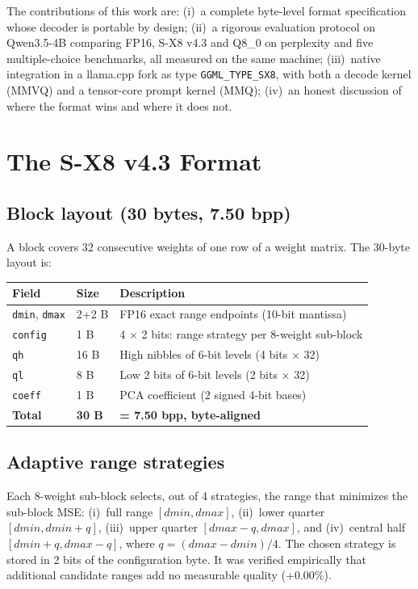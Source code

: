 \documentclass[11pt]{article}
\begin{document}
The contributions of this work are: (i)~a complete byte-level format specification whose decoder is portable by design;
(ii)~a rigorous evaluation protocol on Qwen3.5-4B comparing FP16, S-X8 v4.3 and Q8\_0 on perplexity and
five multiple-choice benchmarks, all measured on the same machine; (iii)~native integration in a llama.cpp
fork as type \texttt{GGML\_TYPE\_SX8}, with both a decode kernel (MMVQ) and a tensor-core prompt kernel
(MMQ); (iv)~an honest discussion of where the format wins and where it does not.

\section{The S-X8 v4.3 Format}
\subsection{Block layout (30 bytes, 7.50 bpp)}
A block covers 32 consecutive weights of one row of a weight matrix. The 30-byte layout is:
\begin{center}
\begin{tabular}{lll}
\toprule
Field & Size & Description \\
\midrule
\texttt{dmin}, \texttt{dmax} & 2+2 B & FP16 exact range endpoints (10-bit mantissa) \\
\texttt{config} & 1 B & 4 $\times$ 2 bits: range strategy per 8-weight sub-block \\
\texttt{qh} & 16 B & High nibbles of 6-bit levels (4 bits $\times$ 32) \\
\texttt{ql} & 8 B & Low 2 bits of 6-bit levels (2 bits $\times$ 32) \\
\texttt{coeff} & 1 B & PCA coefficient (2 signed 4-bit bases) \\
\textbf{Total} & \textbf{30 B} & \textbf{= 7.50 bpp, byte-aligned} \\
\bottomrule
\end{tabular}
\end{center}

\subsection{Adaptive range strategies}
Each 8-weight sub-block selects, out of 4 strategies, the range that minimizes the sub-block MSE:
(i)~full range $[\mathit{dmin}, \mathit{dmax}]$, (ii)~lower quarter $[\mathit{dmin}, \mathit{dmin}+q]$,
(iii)~upper quarter $[\mathit{dmax}-q, \mathit{dmax}]$, and (iv)~central half
$[\mathit{dmin}+q, \mathit{dmax}-q]$, where $q=(\mathit{dmax}-\mathit{dmin})/4$. The chosen strategy is
stored in 2 bits of the configuration byte. It was verified empirically that additional candidate ranges add
no measurable quality (+0.00\%).
\end{document}
